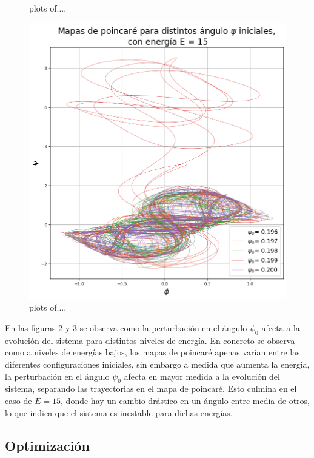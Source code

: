\documentclass[11pt, twoside]{article} %
\begin{document}
\begin{figure}
\begin{subfigure}{.5\textwidth}
        \label{fig:poincare_estabilidad_E_10}
      \end{subfigure}
    \caption{plots of....}
    \label{fig:poincare_estabilidad_E}
\end{figure}
    
\begin{figure}[h!]
    \centering
    \includegraphics[width=0.75\linewidth]{plots/poincare_estabilidad_E_15.png}
    \caption{plots of....}
    \label{fig:poincare_estabilidad_E_15}
\end{figure}

En las figuras \ref{fig:poincare_estabilidad_E} y \ref{fig:poincare_estabilidad_E_15} 
se observa como la perturbación en el ángulo $\psi_0$ afecta a la evolución 
del sistema para distintos niveles de energía. En concreto se observa como 
a niveles de energías bajos, los mapas de poincaré apenas varían entre las
diferentes configuraciones iniciales, sin embargo a medida que aumenta la
energia, la perturbación en el ángulo $\psi_0$ afecta en mayor medida a la
evolución del sistema, separando las trayectorias en el mapa de poincaré. 
Esto culmina en el caso de $E = 15$, donde hay un cambio drástico en un ángulo
entre media de otros, lo que indica que el sistema es inestable para dichas 
energías.

\newpage

\subsection{Optimización}
\end{document}
